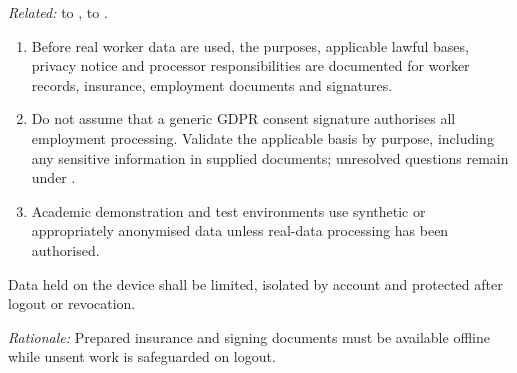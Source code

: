 \textit{Related:} \hyperref[fr:020]{} to \hyperref[fr:023]{}, \hyperref[fr:038]{} to \hyperref[fr:045]{}.
\begin{enumerate}[label=(\alph*),leftmargin=*,itemsep=1pt,topsep=3pt]
\item Before real worker data are used, the purposes, applicable lawful bases, privacy notice and processor responsibilities are documented for worker records, insurance, employment documents and signatures.
\item Do not assume that a generic GDPR consent signature authorises all employment processing. Validate the applicable basis by purpose, including any sensitive information in supplied documents; unresolved questions remain under .
\item Academic demonstration and test environments use synthetic or appropriately anonymised data unless real-data processing has been authorised.
\end{enumerate}

\label{nfr:PRV-03}
Data held on the device shall be limited, isolated by account and protected after logout or revocation.

\textit{Rationale:} Prepared insurance and signing documents must be available offline while unsent work is safeguarded on logout.

